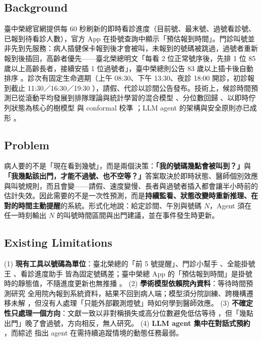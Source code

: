 \documentclass[11pt,twocolumn]{article}
\begin{document}
\subsection{Background}
臺中榮總官網提供每 60 秒刷新的即時看診進度（目前號、最末號、過號看診號、已報到待看診人數），官方 App 在掛號查詢中顯示「預估報到時間」\cite{vghtcapp}。門診叫號並非先到先服務：病人插健保卡報到後才會被叫，未報到的號碼被跳過，過號者重新報到後插回，高齡者優先——臺北榮總明文「每看 2 位正常號序後，先排 1 位 85 歲以上高齡長者，接續安插 1 位過號者」\cite{vghtpe2025}，臺中榮總則公告 83 歲以上插卡後自動排序 \cite{vghtcnotice}。診次有固定生命週期（上午 08:30、下午 13:30、夜診 18:00 開診，初診報到截止 11:30／16:30／19:30 \cite{vghtcreg}），請假、代診以診間公告發布。技術上，候診時間預測已從滾動平均發展到排隊理論與統計學習的混合模型 \cite{ang2016}、分位數回歸 \cite{pak2021}、以即時佇列狀態為核心的樹模型 \cite{shin2024,guo2025,liu2026} 與 conformal 校準 \cite{shahbazi2026}；LLM agent 的架構與安全原則亦已成形 \cite{chowa2026,hasan2026}。

\subsection{Problem}
病人要的不是「現在看到幾號」，而是兩個決策：\textbf{「我的號碼幾點會被叫到？」}與\textbf{「我幾點該出門，才能不過號、也不空等？」}答案取決於即時狀態、醫師個別效應與叫號規則，而且會變——請假、速度變慢、長者與過號者插入都會讓半小時前的估計失效。因此需要的不是一次性預測，而是\textbf{持續監看、狀態改變時重新推理、在對的時間主動提醒}的系統。形式化地說：給定診間、午別與號碼 $N$，Agent 須在任一時刻輸出 $N$ 的叫號時間區間與出門建議，並在事件發生時更新。

\subsection{Existing Limitations}
(1) \textbf{現有工具以號碼為單位}：臺北榮總的「前 5 號提醒」\cite{vghtpeapp}、門診小幫手 \cite{docbot2020}、全能掛號王 \cite{seedoctor}、看診進度助手 \cite{opdhelper} 皆為固定號碼差；臺中榮總 App 的「預估報到時間」是掛號時的靜態值，不隨進度更新也無推播 \cite{vghtcapp}。
(2) \textbf{學術模型依賴院內資料}：等待時間預測研究 \cite{ang2016,pak2021,shin2024,guo2025,wang2025,liu2026} 全用院內報到系統資料，結果不回到病人端；模型須分院訓練、跨機構遷移未解 \cite{ang2016,shin2024,toffaha2025}，但沒有人處理「只能外部觀測燈號」時如何學到醫師效應。
(3) \textbf{不確定性只處理一個方向}：文獻一致以非對稱損失或高分位數避免低估等待 \cite{pak2021,shin2024,zhang2023}，但「幾點出門」晚了會過號，方向相反，無人研究。
(4) \textbf{LLM agent 集中在對話式預約} \cite{hasan2026}，而綜述 \cite{chowa2026} 指出 agent 在需持續追蹤情境的動態任務最弱。
\end{document}

